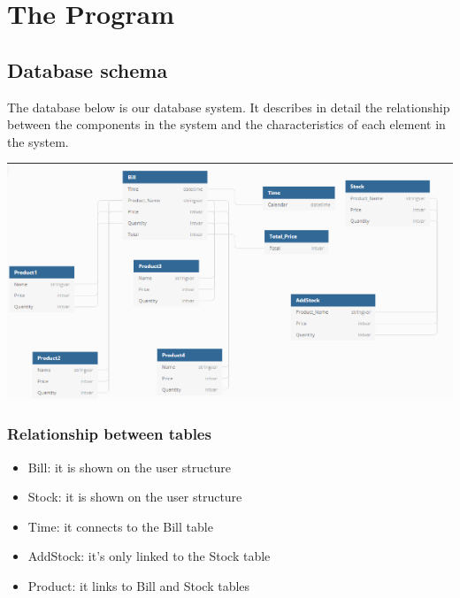 \newpage
\section{The Program}
\subsection{Database schema}
\hspace{0.7cm}The database below is our database system. It describes in detail the relationship between the components in the system and the characteristics of each element in the system.

\vspace{2cm}
\includegraphics{images/database.png}

\newpage
\vspace{6cm}
\subsubsection{Relationship between tables}
\begin{itemize}
 \item Bill: it is shown on the user structure
  \item Stock: it is shown on the user structure
  \item Time: it connects to the Bill table
  \item AddStock: it's only linked to the Stock table
  \item Product: it links to Bill and Stock tables
  
\end{itemize}

\vspace{0.5cm}
